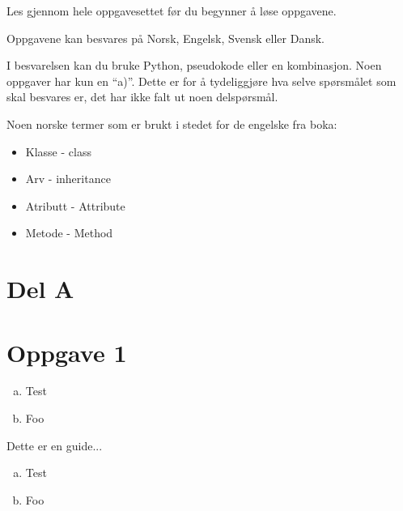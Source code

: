 Les gjennom hele oppgavesettet før du begynner å løse oppgavene. 

Oppgavene kan besvares på Norsk, Engelsk, Svensk eller Dansk. 

I besvarelsen kan du bruke Python, pseudokode eller en kombinasjon.
Noen oppgaver har kun en ``a)''. Dette er for å tydeliggjøre hva selve
spørsmålet som skal besvares er, det har ikke falt ut noen delspørsmål.

Noen norske termer som er brukt i stedet for de engelske fra boka: 
\begin{itemize}
\item Klasse - class
\item Arv - inheritance
\item Atributt - Attribute
\item Metode - Method
\end{itemize}

\section*{Del A}

\section*{Oppgave 1}

\begin{enumerate}[a)]
\item Test
\item Foo
\end{enumerate}

\begin{eguide}
Dette er en guide... 
\begin{enumerate}[a)]
\item Test
\item Foo
\end{enumerate}
\end{eguide}


